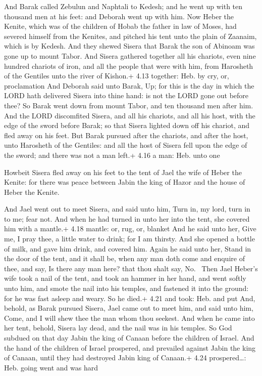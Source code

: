  And Barak called Zebulun and Naphtali to Kedesh; and he
went up with ten thousand men at his feet: and Deborah went up with him.
 Now Heber the Kenite, which was of the children of Hobab
the father in law of Moses, had severed himself from the Kenites, and
pitched his tent unto the plain of Zaanaim, which is by Kedesh.
 And they shewed Sisera that Barak the son of Abinoam was
gone up to mount Tabor.  And Sisera gathered together all
his chariots, even nine hundred chariots of iron, and all the people
that were with him, from Harosheth of the Gentiles unto the river of
Kishon.+ 4.13 together: Heb. by cry, or, proclamation  And
Deborah said unto Barak, Up; for this is the day in which the LORD hath
delivered Sisera into thine hand: is not the LORD gone out before thee?
So Barak went down from mount Tabor, and ten thousand men after him.
 And the LORD discomfited Sisera, and all his chariots, and
all his host, with the edge of the sword before Barak; so that Sisera
lighted down off his chariot, and fled away on his feet. 
But Barak pursued after the chariots, and after the host, unto Harosheth
of the Gentiles: and all the host of Sisera fell upon the edge of the
sword; and there was not a man left.+ 4.16 a man: Heb. unto one

 Howbeit Sisera fled away on his feet to the tent of Jael
the wife of Heber the Kenite: for there was peace between Jabin the king
of Hazor and the house of Heber the Kenite.

 And Jael went out to meet Sisera, and said unto him,
Turn in, my lord, turn in to me; fear not. And when he had turned in
unto her into the tent, she covered him with a mantle.+ 4.18 mantle: or,
rug, or, blanket  And he said unto her, Give me, I pray
thee, a little water to drink; for I am thirsty. And she opened a bottle
of milk, and gave him drink, and covered him.  Again he
said unto her, Stand in the door of the tent, and it shall be, when any
man doth come and enquire of thee, and say, Is there any man here? that
thou shalt say, No.~ Then Jael Heber's wife took a nail of
the tent, and took an hammer in her hand, and went softly unto him, and
smote the nail into his temples, and fastened it into the ground: for he
was fast asleep and weary. So he died.+ 4.21 and took: Heb. and put
 And, behold, as Barak pursued Sisera, Jael came out to
meet him, and said unto him, Come, and I will shew thee the man whom
thou seekest. And when he came into her tent, behold, Sisera lay dead,
and the nail was in his temples.  So God subdued on that
day Jabin the king of Canaan before the children of Israel.
 And the hand of the children of Israel prospered, and
prevailed against Jabin the king of Canaan, until they had destroyed
Jabin king of Canaan.+ 4.24 prospered\ldots: Heb. going went and was
hard

